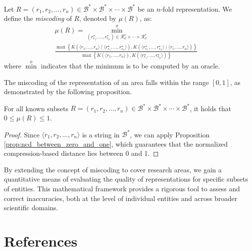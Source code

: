 \begin{definition}
Let $R = \left( r_1, r_2, \ldots, r_n \right) \in \mathcal{B}^\ast \times \mathcal{B}^\ast \times \cdots \times \mathcal{B}^\ast$ be an $n$-fold representation. We define the \emph{miscoding} of $R$, denoted by $\mu(R)$, as:
\begin{multline*}
\mu(R) = \overset{o}{\underset{(r^\star_{e_1}, \ldots, r^\star_{e_n}) \in \mathcal{R}^\star_\mathcal{E} \times \cdots \times \mathcal{R}^\star_\mathcal{E}}{\min}} \\
\frac{
\max\left\{
K\left( \langle r_1, \ldots, r_n \rangle \mid \langle r^\star_{e_1}, \ldots, r^\star_{e_n} \rangle \right),
K\left( \langle r^\star_{e_1}, \ldots, r^\star_{e_n} \rangle \mid \langle r_1, \ldots, r_n \rangle \right)
\right\}
}{
\max\left\{
K\left( \langle r_1, \ldots, r_n \rangle \right),
K\left( \langle r^\star_{e_1}, \ldots, r^\star_{e_n} \rangle \right)
\right\}
}
\end{multline*}
where $\overset{o}{\min}$ indicates that the minimum is to be computed by an oracle.
\end{definition}

The miscoding of the representation of an area falls within the range $[0, 1]$, as demonstrated by the following proposition.

\begin{proposition}
\label{prop:miscoding:area:range}
For all known subsets $R = \left( r_1, r_2, \ldots, r_n \right) \in \mathcal{B}^\ast \times \mathcal{B}^\ast \times \cdots \times \mathcal{B}^\ast$, it holds that $0 \leq \mu(R) \leq 1$.
\end{proposition}
\begin{proof}
Since $\langle r_1, r_2, \ldots, r_n \rangle$ is a string in $\mathcal{B}^\ast$, we can apply Proposition \ref{prop:ncd_between_zero_and_one}, which guarantees that the normalized compression-based distance lies between 0 and 1.
\end{proof}

By extending the concept of miscoding to cover research areas, we gain a quantitative means of evaluating the quality of representations for specific subsets of entities. This mathematical framework provides a rigorous tool to assess and correct inaccuracies, both at the level of individual entities and across broader scientific domains.

%
%

\section*{References}

